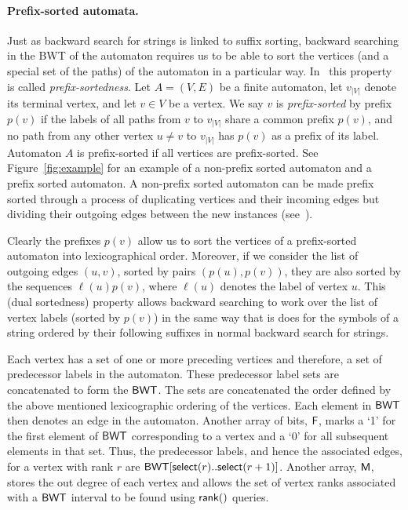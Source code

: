 \paragraph{Prefix-sorted automata.}
Just as backward search for strings is linked to suffix sorting, backward searching in the BWT of the automaton 
requires us to be able to sort the vertices (and a special set of the paths) of the automaton in a particular 
way. In~\cite{dag_method} this property is called {\em prefix-sortedness}. Let $A = (V,E)$ be a finite automaton, 
let $v_{|V|}$ denote its terminal vertex, and let $v \in V$ be a vertex. We say $v$ is {\em prefix-sorted} by 
prefix $p(v)$ if the labels of all paths from $v$ to $v_{|V|}$ share a common prefix $p(v)$, and no path from any 
other vertex $u \ne v$ to $v_{|V|}$ has $p(v)$ as a prefix of its label. Automaton $A$ is prefix-sorted if all 
vertices are prefix-sorted. See Figure~\ref{fig:example} for an example of a non-prefix sorted automaton and a 
prefix sorted automaton. A non-prefix sorted automaton can be made prefix sorted through a process of duplicating 
vertices and their incoming edges but dividing their outgoing edges between the new instances (see~\cite{dag_method}).

Clearly the prefixes $p(v)$ allow us to sort the vertices of a prefix-sorted automaton into lexicographical 
order. Moreover, if we consider the list of outgoing edges $(u,v)$, sorted by pairs $(p(u),p(v))$, they are
also sorted by the sequences $\ell(u)p(v)$, where $\ell(u)$ denotes the label of vertex $u$. This (dual sortedness)
property allows backward searching to work over the list of vertex labels (sorted by $p(v)$) in the same way
that is does for the symbols of a string ordered by their following suffixes in normal backward search for 
strings.

Each vertex has a set of one or more preceding vertices and therefore, a set of predecessor labels in the 
automaton. These predecessor label sets are concatenated to form the $\mbox{\rm {\sf BWT}}$. The sets are concatenated the 
order defined by the above mentioned lexicographic ordering of the vertices. Each element in $\mbox{\rm {\sf BWT}}$ then 
denotes an edge in the automaton. Another array of bits, $\mbox{\rm {\sf F}}$, marks a `1' for the first element of $\mbox{\rm {\sf BWT}}$ 
corresponding to a vertex and a `0' for all subsequent elements in that set. Thus, the predecessor labels, 
and hence the associated edges, for a vertex with rank $r$ are $\mbox{\rm {\sf BWT}}[\textsf{select}(r)..\textsf{select}(r+1)]$. Another 
array, $\mbox{\rm {\sf M}}$, stores the out degree of each vertex and allows the set of vertex ranks associated with a $\mbox{\rm {\sf BWT}}$ 
interval to be found using $\textsf{rank}()$ queries.

